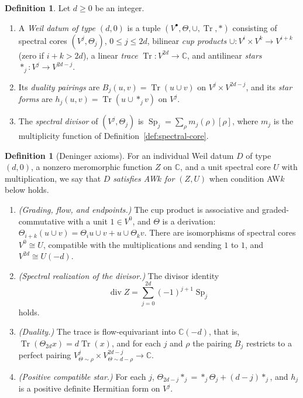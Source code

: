 \documentclass[11pt]{amsart}
\theoremstyle{plain}
\theoremstyle{definition}
\newtheorem{definition}[theorem]{Definition}
\theoremstyle{remark}
\numberwithin{equation}{section}
\newcommand{\C}{\mathbb{C}}
\DeclareMathOperator{\Tr}{Tr}
\DeclareMathOperator{\divisor}{div}
\begin{document}
\begin{definition}\label{def:aw}
Let $d\ge0$ be an integer.
\begin{enumerate}[label=(\alph*)]
\item A \emph{Weil datum of type $(d,0)$} is a tuple
  $(V^\bullet,\Theta,\cup,\Tr,*)$ consisting of spectral cores
  $(V^j,\Theta_j)$, $0\le j\le2d$, bilinear \emph{cup products}
  $\cup:V^i\times V^k\to V^{i+k}$ (zero if $i+k>2d$), a linear
  \emph{trace} $\Tr:V^{2d}\to\C$, and antilinear \emph{stars}
  $*_j:V^j\to V^{2d-j}$.
\item Its \emph{duality pairings} are
  $B_j(u,v)=\Tr(u\cup v)$ on $V^j\times V^{2d-j}$, and its \emph{star
  forms} are $h_j(u,v)=\Tr(u\cup*_jv)$ on $V^j$.
\item The \emph{spectral divisor} of $(V^j,\Theta_j)$ is
  $\operatorname{Sp}_j=\sum_\rho m_j(\rho)[\rho]$, where $m_j$ is the
  multiplicity function of Definition~\ref{def:spectral-core}.
\end{enumerate}
\end{definition}

\begin{definition}[Deninger axioms]
\label{def:weil-cohomology}
For an individual Weil datum $D$ of type $(d,0)$, a nonzero meromorphic
function $Z$ on $\C$, and a unit spectral core $U$ with multiplication,
we say that $D$ \emph{satisfies AW$k$ for $(Z,U)$} when condition AW$k$
below holds.
\begin{enumerate}[label=\textbf{AW\arabic*},ref=AW\arabic*,
  leftmargin=*]
\item\label{ax:AW1} \emph{(Grading, flow, and endpoints.)} The cup
  product is associative and graded-commutative with a unit $1\in V^0$,
  and $\Theta$ is a derivation:
  $\Theta_{i+k}(u\cup v)=\Theta_iu\cup v+u\cup\Theta_kv$. There are
  isomorphisms of spectral cores $V^0\cong U$, compatible with
  the multiplications and sending $1$ to $1$, and $V^{2d}\cong U(-d)$.
\item\label{ax:AW2} \emph{(Spectral realization of the divisor.)} The
  divisor identity
  \begin{equation}\label{eq:aw-div}
  \divisor Z=\sum_{j=0}^{2d}(-1)^{j+1}\operatorname{Sp}_j
  \tag{AW-div}
  \end{equation}
  holds.
\item\label{ax:AW3} \emph{(Duality.)} The trace is flow-equivariant into
  $\C(-d)$, that is, $\Tr(\Theta_{2d}x)=d\Tr(x)$, and for each $j$
  and $\rho$ the pairing $B_j$ restricts to a perfect pairing
  $V^j_{\Theta\sim\rho}\times V^{2d-j}_{\Theta\sim d-\rho}\to\C$.
\item\label{ax:AW4} \emph{(Positive compatible star.)} For each $j$,
  $\Theta_{2d-j}*_j=*_j\Theta_j+(d-j)*_j$, and $h_j$ is a positive
  definite Hermitian form on $V^j$.
\end{enumerate}
\end{definition}
\end{document}
